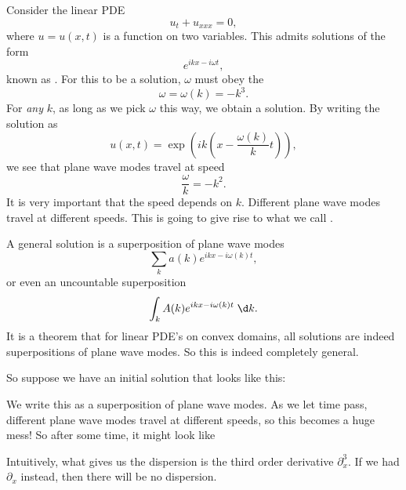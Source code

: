 \documentclass[a4paper]{article}
\begin{document}
\begin{eg}
  Consider the linear PDE
  \[
    u_t + u_{xxx} = 0,
  \]
  where $u = u(x, t)$ is a function on two variables. This admits solutions of the form
  \[
    e^{ikx - i\omega t},
  \]
  known as . For this to be a solution, $\omega$ must obey the 
  \[
    \omega = \omega(k) = -k^3.
  \]
  For \emph{any} $k$, as long as we pick $\omega$ this way, we obtain a solution. By writing the solution as
  \[
    u(x, t) = \exp\left(ik\left(x - \frac{\omega(k)}{k}t\right)\right),
  \]
  we see that plane wave modes travel at speed
  \[
    \frac{\omega}{k} = -k^2.
  \]
  It is very important that the speed depends on $k$. Different plane wave modes travel at different speeds. This is going to give rise to what we call .

  A general solution is a superposition of plane wave modes
  \[
    \sum_k a(k) e^{ikx - i \omega(k) t},
  \]
  or even an uncountable superposition
  \[
    \int_k A(k) e^{ikx - i\omega(k)t}\;\d k.
  \]
  It is a theorem that for linear PDE's on convex domains, all solutions are indeed superpositions of plane wave modes. So this is indeed completely general.

  So suppose we have an initial solution that looks like this:
  \begin{center}
  \end{center}
  We write this as a superposition of plane wave modes. As we let time pass, different plane wave modes travel at different speeds, so this becomes a huge mess! So after some time, it might look like
  \begin{center}
  \end{center}
  Intuitively, what gives us the dispersion is the third order derivative $\partial^3_x$. If we had $\partial_x$ instead, then there will be no dispersion.
\end{eg}
\end{document}

